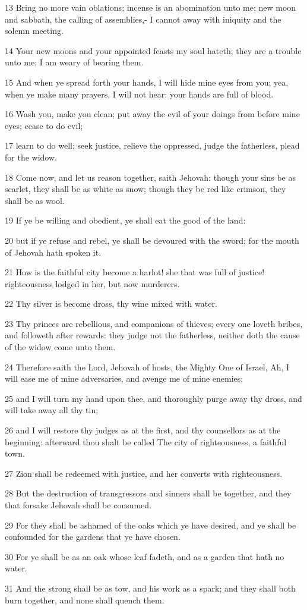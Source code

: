 \par 13 Bring no more vain oblations; incense is an abomination unto me; new moon and sabbath, the calling of assemblies,- I cannot away with iniquity and the solemn meeting.
\par 14 Your new moons and your appointed feasts my soul hateth; they are a trouble unto me; I am weary of bearing them.
\par 15 And when ye spread forth your hands, I will hide mine eyes from you; yea, when ye make many prayers, I will not hear: your hands are full of blood.
\par 16 Wash you, make you clean; put away the evil of your doings from before mine eyes; cease to do evil;
\par 17 learn to do well; seek justice, relieve the oppressed, judge the fatherless, plead for the widow.
\par 18 Come now, and let us reason together, saith Jehovah: though your sins be as scarlet, they shall be as white as snow; though they be red like crimson, they shall be as wool.
\par 19 If ye be willing and obedient, ye shall eat the good of the land:
\par 20 but if ye refuse and rebel, ye shall be devoured with the sword; for the mouth of Jehovah hath spoken it.
\par 21 How is the faithful city become a harlot! she that was full of justice! righteousness lodged in her, but now murderers.
\par 22 Thy silver is become dross, thy wine mixed with water.
\par 23 Thy princes are rebellious, and companions of thieves; every one loveth bribes, and followeth after rewards: they judge not the fatherless, neither doth the cause of the widow come unto them.
\par 24 Therefore saith the Lord, Jehovah of hosts, the Mighty One of Israel, Ah, I will ease me of mine adversaries, and avenge me of mine enemies;
\par 25 and I will turn my hand upon thee, and thoroughly purge away thy dross, and will take away all thy tin;
\par 26 and I will restore thy judges as at the first, and thy counsellors as at the beginning: afterward thou shalt be called The city of righteousness, a faithful town.
\par 27 Zion shall be redeemed with justice, and her converts with righteousness.
\par 28 But the destruction of transgressors and sinners shall be together, and they that forsake Jehovah shall be consumed.
\par 29 For they shall be ashamed of the oaks which ye have desired, and ye shall be confounded for the gardens that ye have chosen.
\par 30 For ye shall be as an oak whose leaf fadeth, and as a garden that hath no water.
\par 31 And the strong shall be as tow, and his work as a spark; and they shall both burn together, and none shall quench them.

